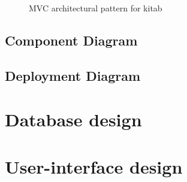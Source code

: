 		\begin{figure}[H]
		\begin{center}

		\caption{MVC architectural pattern for kitab}
		\label{dia_mvc_arch_pattern}

		\end{center}
		\end{figure}

	\subsection{Component Diagram}

	\subsection{Deployment Diagram}

\section{Database design}

\section{User-interface design}